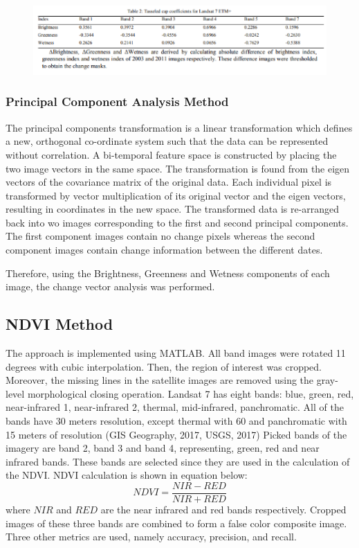 \documentclass[12pt,a4paper]{article}
\begin{document}
\begin{figure}[h]
	\centering
	\includegraphics[width=0.7\linewidth]{./tasseledcap}
	\label{fig:tasseledcap}
\end{figure}

\subsubsection[3.4.2]{Principal Component Analysis Method}
The principal components transformation is a linear transformation which defines a new, orthogonal co-ordinate 
system such that the data can be represented without correlation. A bi-temporal feature space is constructed by 
placing the two image vectors in the same space. The transformation is found from the eigen vectors of the 
covariance matrix of the original data. Each individual pixel is transformed by vector multiplication of its original 
vector and the eigen vectors, resulting in coordinates in the new space. The transformed data is re-arranged back into
wo images corresponding to the first and second principal components. The first component images contain no change pixels whereas the second component images contain change information between the different dates.

Therefore, using the Brightness, Greenness and Wetness components of each image, the change vector analysis was performed. 


\subsection[3.5]{NDVI Method}
The approach is implemented using MATLAB. All band 
images were rotated 11 degrees with cubic interpolation. Then, 
the region of interest was cropped. Moreover, the missing lines in the satellite images are removed using 
the gray-level morphological closing operation. 
\newline Landsat 7 has eight bands: blue, green, red, near-infrared 1, 
near-infrared 2, thermal, mid-infrared, panchromatic. All of the 
bands have 30 meters resolution, except thermal with 60 and 
panchromatic with 15 meters of resolution (GIS Geography, 
2017, USGS, 2017)
\newline Picked bands of the imagery are band 2, 
band 3 and band 4, representing, green, red and near infrared 
bands. These bands are selected since they are used in the 
calculation of the NDVI. NDVI calculation is shown in equation below:
\begin{equation}
NDVI = \frac{NIR - RED}{NIR + RED}
\end{equation}
where $NIR$ and $RED$ are the near infrared and red bands respectively.
\newline Cropped images of these three bands are combined to form a 
false color composite image. 
Three other metrics are used, namely accuracy, precision, and recall.
\end{document}
